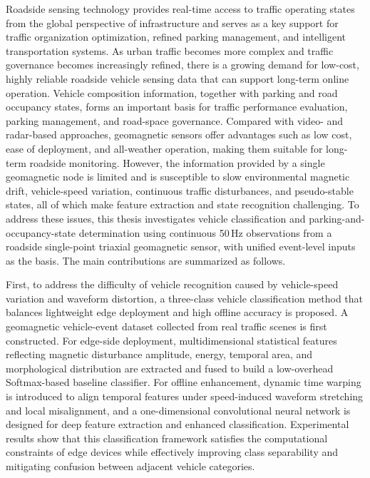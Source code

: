 
Roadside sensing technology provides real-time access to traffic operating states from the global perspective of infrastructure and serves as a key support for traffic organization optimization, refined parking management, and intelligent transportation systems. As urban traffic becomes more complex and traffic governance becomes increasingly refined, there is a growing demand for low-cost, highly reliable roadside vehicle sensing data that can support long-term online operation. Vehicle composition information, together with parking and road occupancy states, forms an important basis for traffic performance evaluation, parking management, and road-space governance. Compared with video- and radar-based approaches, geomagnetic sensors offer advantages such as low cost, ease of deployment, and all-weather operation, making them suitable for long-term roadside monitoring. However, the information provided by a single geomagnetic node is limited and is susceptible to slow environmental magnetic drift, vehicle-speed variation, continuous traffic disturbances, and pseudo-stable states, all of which make feature extraction and state recognition challenging. To address these issues, this thesis investigates vehicle classification and parking-and-occupancy-state determination using continuous 50\,Hz observations from a roadside single-point triaxial geomagnetic sensor, with unified event-level inputs as the basis. The main contributions are summarized as follows.

First, to address the difficulty of vehicle recognition caused by vehicle-speed variation and waveform distortion, a three-class vehicle classification method that balances lightweight edge deployment and high offline accuracy is proposed. A geomagnetic vehicle-event dataset collected from real traffic scenes is first constructed. For edge-side deployment, multidimensional statistical features reflecting magnetic disturbance amplitude, energy, temporal area, and morphological distribution are extracted and fused to build a low-overhead Softmax-based baseline classifier. For offline enhancement, dynamic time warping is introduced to align temporal features under speed-induced waveform stretching and local misalignment, and a one-dimensional convolutional neural network is designed for deep feature extraction and enhanced classification. Experimental results show that this classification framework satisfies the computational constraints of edge devices while effectively improving class separability and mitigating confusion between adjacent vehicle categories.


